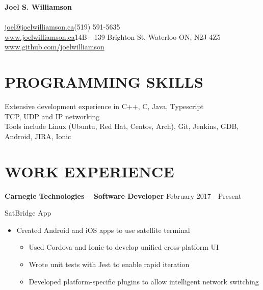 \documentclass{res}
\begin{document}
 

\begin{center}
{\Large\bf Joel S. Williamson}
\end{center}
\paragraph{}
       \href{mailto:joel@joelwilliamson.ca}{joel@joelwilliamson.ca}\hfill(519) 591-5635\\
       \url{www.joelwilliamson.ca}\hfill14B - 139 Brighton St, Waterloo ON, N2J 4Z5\\
       \url{www.github.com/joelwilliamson}
 
\begin{resume}

  \vspace{-5mm}
  \section{PROGRAMMING SKILLS}
  Extensive development experience in C++, C, Java, Typescript\\
  TCP, UDP and IP networking\\
  Tools include Linux (Ubuntu, Red Hat, Centos, Arch), Git, Jenkins, GDB, Android, JIRA, Ionic
  \section{WORK EXPERIENCE}
         {\bf Carnegie Technologies -- Software Developer} \hfill February 2017 - Present\vspace{-3mm}

         SatBridge App
         \begin{itemize}
           \item Created Android and iOS apps to use satellite terminal
           \begin{itemize}
             \item Used Cordova and Ionic to develop unified cross-platform UI
             \item Wrote unit tests with Jest to enable rapid iteration
             \item Developed platform-specific plugins to allow intelligent network switching
           \end{itemize}
         \end{itemize}


\end{resume}
\end{document}
